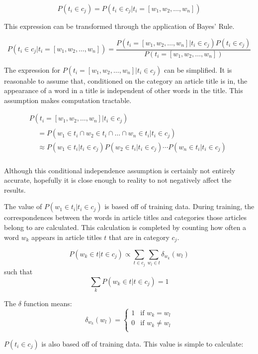 \documentclass{article}
\begin{document}
\[P(t_i \in c_j) = P(t_i \in c_j | t_i = [w_1, w_2, \dots, w_n])\]

This expression can be transformed through the application of Bayes' Rule.

\[P(t_i \in c_j | t_i = [w_1, w_2, \dots, w_n]) = \frac{P(t_i = [w_1, w_2,
  \dots, w_n] | t_i \in c_j) P(t_i \in c_j)}{P(t_i = [w_1, w_2, \dots, w_n])}\]

The expression for $P(t_i = [w_1, w_2, \dots, w_n] | t_i \in c_j)$ can be
simplified. It is reasonable to assume that, conditioned on the category an
article title is in, the appearance of a word in a title is independent of
other words in the title. This assumption makes computation tractable.

\begin{multline*}
P(t_i = [w_1, w_2, \dots, w_n] | t_i \in c_j) \\
\begin{aligned}
& = P(w_1 \in t_i \cap w_2 \in t_i \cap \dots \cap w_n \in t_i | t_i \in c_j) \\
& \approx P(w_1 \in t_i | t_i \in c_j) P(w_2 \in t_i | t_i \in c_j) \cdots P(w_n
\in t_i | t_i \in c_j) \\
\end{aligned}
\end{multline*}

Although this conditional independence assumption is certainly not entirely
accurate, hopefully it is close enough to reality to not negatively affect the
results.

The value of $P(w_1 \in t_i | t_i \in c_j)$ is based off of training data.
During training, the correspondences between the words in article titles and
categories those articles belong to are calculated. This calculation is
completed by counting how often a word $w_k$ appears in article titles $t$ that
are in category $c_j$. 

\[P(w_k \in t | t \in c_j) \propto \displaystyle \sum_{t \in c_j} \sum_{w_l \in t}
    \delta_{w_k} (w_l)\]
such that
\[\displaystyle \sum_k P(w_k \in t | t \in c_j) = 1\]

The $\delta$ function means:
\[\delta_{w_k} (w_l) = \begin{cases}
  1 & \text{if } w_k = w_l  \\
  0 & \text{if } w_k \neq w_l \\
\end{cases} \]

$P(t_i \in c_j)$ is also based off of training data.  This value is simple to
calculate:
\end{document}
